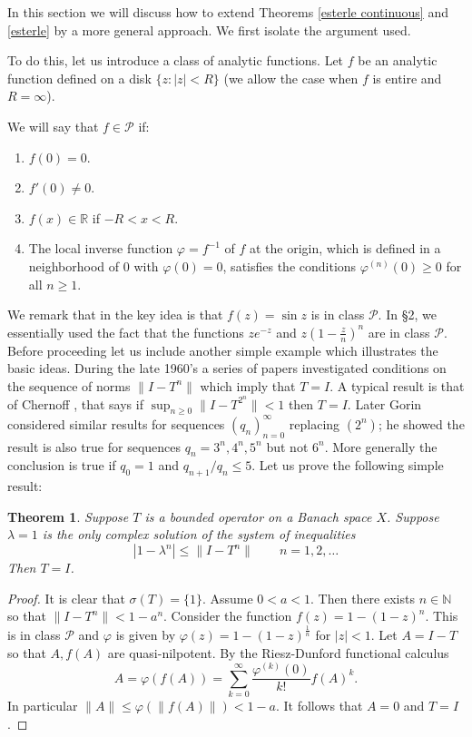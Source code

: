 \documentclass[12pt]{amsart}
\newtheorem{thm}{Theorem}[section]
\begin{document}
In this section we will discuss how to extend Theorems
\ref{esterle continuous} and \ref{esterle} by a more general
approach. We first isolate the argument used.

To do this, let us introduce a class of analytic functions.  Let
$f$ be an analytic function defined on a disk $\{z:|z|<R\}$ (we
allow the case when $f$ is entire and $R=\infty$).


We will say
that $f\in \mathcal P$ if:\begin{enumerate}
\item $f(0)=0$.\item $f'(0)\neq 0$.\item $f(x)\in\mathbb R$ if
$-R<x<R$.
\item The local inverse function $\varphi=f^{-1}$ of $f$ at the origin,
which is defined in a
neighborhood of $0$ with $\varphi(0)=0$, satisfies the conditions
$\varphi^{(n)}(0)\ge 0$ for all $n\ge 1$.
\end{enumerate}

We remark that in \cite{bonsall-crabb} the key idea is that
$f(z)=\sin z$ is in class $\mathcal P$.  In \S2, we essentially
used the fact that the functions $ze^{-z}$ and $z(1-\frac{z}n)^n$
are in class $\mathcal P$. Before proceeding let us include
another simple example which illustrates the basic ideas. During
the late 1960's a series of papers investigated conditions on the
sequence of norms $\|I-T^n\|$ which imply that $T=I$.  A typical
result is that of Chernoff \cite{chernoff}, that says if
$\sup_{n\ge 0}\|I-T^{2^n}\|<1$ then $T=I$.
Later Gorin \cite{gorin} considered
similar results for sequences $(q_n)_{n=0}^{\infty}$ replacing
$(2^n)$; he showed the result is also true for sequences
 $q_n=3^n,4^n,5^n$ but not $6^n$. More generally the conclusion
is true if $q_0=1$ and $q_{n+1}/q_n\le 5$.
Let us prove the following
simple result:

\begin{thm}\label{chernoffgorin} Suppose $T$ is a bounded operator on a
Banach space
$X$.  Suppose $\lambda=1$ is the only complex
solution of the
system of inequalities
$$ |1-\lambda^n|\le \|I-T^n\| \qquad n=1,2,\ldots$$
Then $T=I$.\end{thm}

\begin{proof} It is clear that $\sigma(T)=\{1\}$.
Assume $0<a<1$.  Then there exists $n\in\mathbb N$ so that
$\|I-T^n\|<1-a^n$. Consider the function $f(z)=1-(1-z)^n$.  This
is in class $\mathcal P$ and $\varphi$ is given by $\varphi(z)=
1-(1-z)^{\frac1n}$ for $|z|<1$. Let $A=I-T$ so that $A,f(A)$ are
quasi-nilpotent.  By the Riesz-Dunford functional calculus $$
A=\varphi(f(A))=\sum_{k=0}^{\infty}\frac{\varphi^{(k)}(0)}{k!}f(A)^k.$$
In particular $\|A\| \le \varphi(\|f(A)\|)<1-a$.  It follows that
$A=0$ and $T=I$.\end{proof}
\end{document}
